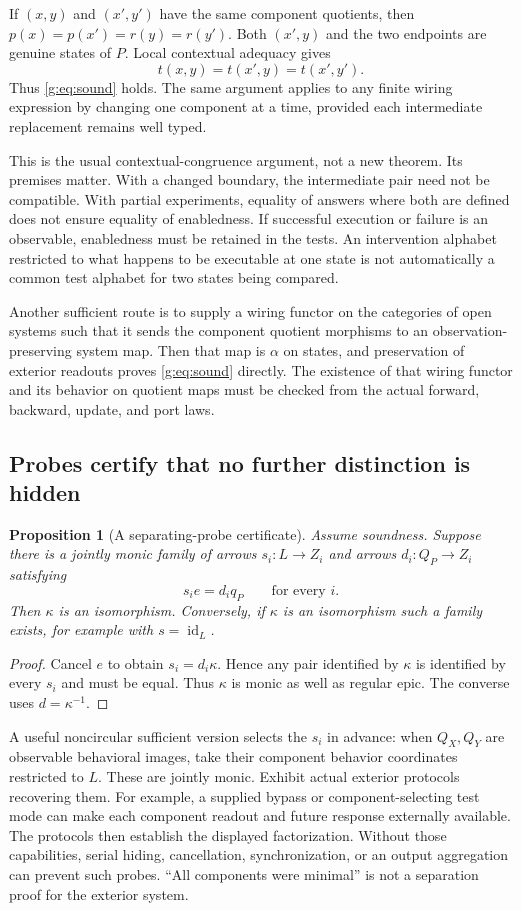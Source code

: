 \documentclass[11pt]{article}
\newtheorem{proposition}[theorem]{Proposition}
\theoremstyle{definition}
\theoremstyle{remark}\newtheorem{remark}[theorem]{Remark}
\newcommand{\id}{\operatorname{id}}
\begin{document}
If $(x,y)$ and $(x',y')$ have the same component quotients, then
$p(x)=p(x')=r(y)=r(y')$. Both $(x',y)$ and the two endpoints are genuine
states of $P$. Local contextual adequacy gives
\[
 t(x,y)=t(x',y)=t(x',y').
\]
Thus \eqref{g:eq:sound} holds. The same argument applies to any finite
wiring expression by changing one component at a time, provided each
intermediate replacement remains well typed.

This is the usual contextual-congruence argument, not a new theorem. Its
premises matter. With a changed boundary, the intermediate pair need not
be compatible. With partial experiments, equality of answers where both
are defined does not ensure equality of enabledness. If successful
execution or failure is an observable, enabledness must be retained in
the tests. An intervention alphabet restricted to what happens to be
executable at one state is not automatically a common test alphabet for
two states being compared.

Another sufficient route is to supply a wiring functor on the categories
of open systems such that it sends the component quotient morphisms to an
observation-preserving system map. Then that map is $\alpha$ on states,
and preservation of exterior readouts proves \eqref{g:eq:sound} directly.
The existence of that wiring functor and its behavior on quotient maps
must be checked from the actual forward, backward, update, and port laws.

\subsection{Probes certify that no further distinction is hidden}
\begin{proposition}[A separating-probe certificate]\label{g:prop:probes}
Assume soundness. Suppose there is a jointly monic family of arrows
$s_i:L\to Z_i$ and arrows $d_i:Q_P\to Z_i$ satisfying
\[
 s_i e=d_iq_P\qquad\text{for every }i.
\]
Then $\kappa$ is an isomorphism. Conversely, if $\kappa$ is an
isomorphism such a family exists, for example with $s=\id_L$.
\end{proposition}
\begin{proof}
Cancel $e$ to obtain $s_i=d_i\kappa$. Hence any pair identified by
$\kappa$ is identified by every $s_i$ and must be equal. Thus $\kappa$
is monic as well as regular epic. The converse uses
$d=\kappa^{-1}$.
\end{proof}

A useful noncircular sufficient version selects the $s_i$ in advance:
when $Q_X,Q_Y$ are observable behavioral images, take their component
behavior coordinates restricted to $L$. These are jointly monic. Exhibit
actual exterior protocols recovering them.
For example, a supplied bypass or component-selecting test mode can make
each component readout and future response externally available. The
protocols then establish the displayed factorization. Without those
capabilities, serial hiding, cancellation, synchronization, or an output
aggregation can prevent such probes. ``All components were minimal'' is
not a separation proof for the exterior system.
\end{document}
